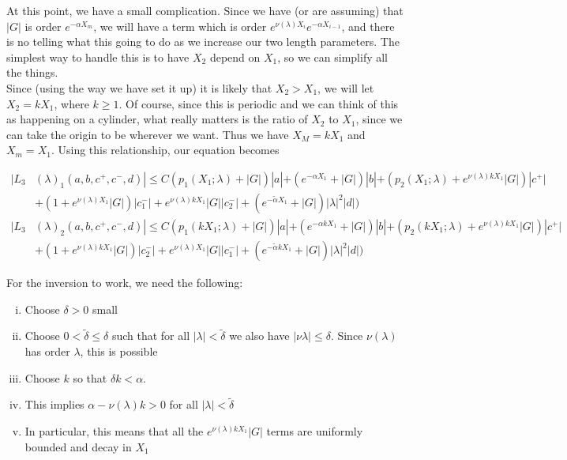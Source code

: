 \documentclass[12pt]{article}
\begin{document}
\begin{enumerate}
At this point, we have a small complication. Since we have (or are assuming) that $|G|$ is order $e^{-\alpha X_m}$, we will have a term which is order $e^{\nu(\lambda)X_i} e^{-\alpha X_{i-1}}$, and there is no telling what this going to do as we increase our two length parameters. The simplest way to handle this is to have $X_2$ depend on $X_1$, so we can simplify all the things.\\

Since (using the way we have set it up) it is likely that $X_2 > X_1$, we will let $X_2 = k X_1$, where $k \geq 1$. Of course, since this is periodic and we can think of this as happening on a cylinder, what really matters is the ratio of $X_2$ to $X_1$, since we can take the origin to be wherever we want. Thus we have $X_M = k X_1$ and $X_m = X_1$. Using this relationship, our equation becomes

\begin{align*}
|L_3&(\lambda)_1(a, b, c^+, c^-, d)| \leq C (p_1(X_1; \lambda) + |G|)|a| + (e^{-\alpha X_1} + |G|) |b| + ( p_2(X_1; \lambda) + e^{\nu(\lambda) k X_1 } |G|) |c^+| \\
&+ (1 + e^{\nu(\lambda)X_1} |G|)|c_1^-| + e^{\nu(\lambda)k X_1} |G||c_2^-| + (e^{-\tilde{\alpha} X_1} + |G|) |\lambda|^2 |d| ) \\
|L_3&(\lambda)_2(a, b, c^+, c^-, d)| \leq C (p_1(k X_1; \lambda) + |G|)|a| + (e^{-\alpha k X_1} + |G|) |b| + ( p_2(k X_1; \lambda) + e^{\nu(\lambda) k X_1 } |G|) |c^+| \\
&+ (1 + e^{\nu(\lambda)k X_1} |G|)|c_2^-| + e^{\nu(\lambda)X_1} |G||c_1^-| + (e^{-\tilde{\alpha} k X_1} + |G|) |\lambda|^2 |d| )
\end{align*}

For the inversion to work, we need the following:

\begin{enumerate}[(i)]
\item Choose $\delta > 0$ small
\item Choose $0 < \tilde{\delta} \leq \delta$ such that for all $|\lambda| < \tilde{\delta}$ we also have $|\nu{\lambda}| \leq \delta$. Since $\nu(\lambda)$ has order $\lambda$, this is possible
\item Choose $k$ so that $\delta k < \alpha$. 
\item This implies $\alpha - \nu(\lambda) k > 0$ for all $|\lambda| < \tilde{\delta}$
\item In particular, this means that all the $e^{\nu(\lambda)k X_1} |G|$ terms are uniformly bounded and decay in $X_1$
\end{enumerate}


\end{enumerate}
\end{document}
